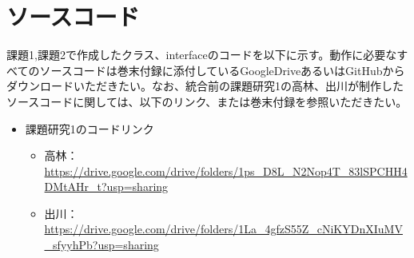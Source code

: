 \documentclass[dvipdfmx]{jsarticle}
\begin{document}
\section{ソースコード}
課題1,課題2で作成したクラス、interfaceのコードを以下に示す。動作に必要なすべてのソースコードは巻末付録に添付しているGoogleDriveあるいはGitHubからダウンロードいただきたい。なお、統合前の課題研究1の高林、出川が制作したソースコードに関しては、以下のリンク、または巻末付録を参照いただきたい。
\begin{itemize}
  \item 課題研究1のコードリンク
  \begin{itemize}
    \item 高林：\url{https://drive.google.com/drive/folders/1ps_D8L_N2Nop4T_83lSPCHH4DMtAHr_t?usp=sharing}
    \item 出川：\url{https://drive.google.com/drive/folders/1La_4gfzS55Z_cNiKYDnXIuMV_sfyyhPb?usp=sharing}
  \end{itemize}
\end{itemize}
\end{document}
